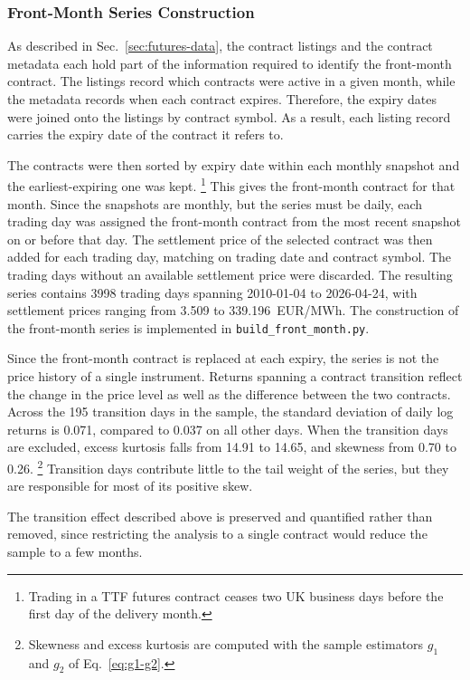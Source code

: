 \subsubsection{Front-Month Series Construction}\label{sec:m1-construction}
As described in Sec.~\ref{sec:futures-data}, the contract listings and the
contract metadata each hold part of the information required to identify
the front-month contract. The listings record which contracts were active in a
given month, while the metadata records when each contract expires. Therefore, the expiry dates were joined onto the listings by contract symbol. As a result, each listing record carries the expiry date of the contract it refers to. 

The contracts were then sorted by expiry date within each monthly snapshot and the earliest-expiring one was kept. \footnote{Trading in a TTF futures
contract ceases two UK business days before the first day of the delivery month.} This gives the front-month contract for that month. Since the snapshots are monthly, but the series must be daily, each trading day was assigned the front-month contract from the most recent snapshot on or before that day.
The settlement price of the selected contract was then added for each trading day, matching on trading date and contract symbol. The trading days without an available settlement price were discarded. The resulting series contains \num{3998} trading days spanning 2010-01-04 to 2026-04-24, with settlement prices ranging from \num{3.509} to \num{339.196}~EUR/MWh. The construction of the front-month series is implemented in \texttt{build\_front\_month.py}.

Since the front-month contract is replaced at each expiry, the series is not the price history of a single instrument. Returns spanning a contract transition reflect the change in the price level as well as the difference between the two contracts. Across the \num{195} transition days in the sample, the standard deviation of daily log returns is \num{0.071}, compared to \num{0.037} on all other days. When the transition days are excluded, excess kurtosis falls from \num{14.91} to \num{14.65}, and skewness from \num{0.70} to \num{0.26}. \footnote{Skewness and excess kurtosis are computed with the sample estimators $g_1$ and $g_2$ of Eq.~\eqref{eq:g1-g2}.} Transition days contribute little to the tail weight of the series, but they are responsible for most of its positive skew. 


The transition effect described above is preserved and quantified rather than removed, since restricting the analysis to a single contract would reduce the sample to a few months.

